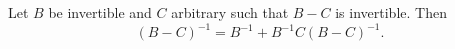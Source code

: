 \begin{lemma}\label{lem:resolvent-identity}
Let $B$ be invertible and $C$ arbitrary such that $B - C$ is invertible. Then
\begin{equation}\label{eq:resolvent-identity}
(B - C)^{-1} = B^{-1} + B^{-1} C (B - C)^{-1}.
\end{equation}
\end{lemma}
